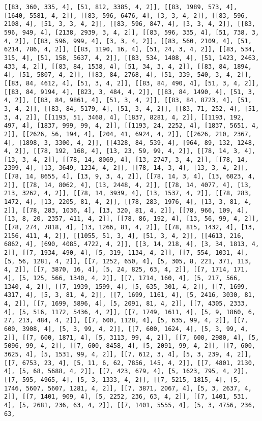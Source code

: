 \documentclass[12pt,fleqn]{article}\usepackage{../../common}
\begin{document}
\begin{verbatim}
[[83, 360, 335, 4], [51, 812, 3385, 4, 2]], [[83, 1989, 573, 4], [1640, 5581, 4, 2]], [[83, 596, 6476, 4], [3, 3, 4, 2]], [[83, 596, 2108, 4], [51, 3, 3, 4, 2]], [[83, 596, 847, 4], [3, 3, 4, 2]], [[83, 596, 949, 4], [2138, 2939, 3, 4, 2]], [[83, 596, 335, 4], [51, 738, 3, 4, 2]], [[83, 596, 999, 4], [3, 3, 4, 2]], [[83, 560, 2109, 4], [51, 6214, 786, 4, 2]], [[83, 1190, 16, 4], [51, 24, 3, 4, 2]], [[83, 534, 315, 4], [51, 158, 5637, 4, 2]], [[83, 534, 1408, 4], [51, 1423, 2463, 433, 4, 2]], [[83, 84, 1538, 4], [51, 34, 3, 4, 2]], [[83, 84, 1894, 4], [51, 5807, 4, 2]], [[83, 84, 2768, 4], [51, 339, 540, 3, 4, 2]], [[83, 84, 4612, 4], [51, 3, 4, 2]], [[83, 84, 490, 4], [51, 3, 4, 2]], [[83, 84, 9194, 4], [823, 3, 484, 4, 2]], [[83, 84, 1490, 4], [51, 3, 4, 2]], [[83, 84, 9861, 4], [51, 3, 4, 2]], [[83, 84, 8723, 4], [51, 3, 4, 2]], [[83, 84, 5179, 4], [51, 3, 4, 2]], [[83, 71, 252, 4], [51, 3, 4, 2]], [[1193, 51, 3468, 4], [1837, 8281, 4, 2]], [[1193, 192, 497, 4], [1837, 999, 99, 4, 2]], [[1193, 24, 2252, 4], [1837, 5651, 4, 2]], [[2626, 56, 194, 4], [204, 41, 6924, 4, 2]], [[2626, 210, 2367, 4], [1898, 3, 3300, 4, 2]], [[4328, 84, 539, 4], [964, 89, 132, 1248, 4, 2]], [[78, 192, 168, 4], [13, 23, 59, 99, 4, 2]], [[78, 14, 3, 4], [13, 3, 4, 2]], [[78, 14, 8069, 4], [13, 2747, 3, 4, 2]], [[78, 14, 2399, 4], [13, 3649, 1234, 4, 2]], [[78, 14, 3, 4], [13, 3, 4, 2]], [[78, 14, 8655, 4], [13, 9, 3, 4, 2]], [[78, 14, 3, 4], [13, 6023, 4, 2]], [[78, 14, 8062, 4], [13, 2448, 4, 2]], [[78, 14, 4077, 4], [13, 213, 3262, 4, 2]], [[78, 14, 3939, 4], [13, 1537, 4, 2]], [[78, 283, 1472, 4], [13, 2205, 81, 4, 2]], [[78, 283, 1976, 4], [13, 3, 81, 4, 2]], [[78, 283, 1036, 4], [13, 320, 81, 4, 2]], [[78, 966, 109, 4], [13, 8, 20, 2357, 411, 4, 2]], [[78, 86, 192, 4], [13, 56, 99, 4, 2]], [[78, 274, 7818, 4], [13, 1266, 81, 4, 2]], [[78, 815, 1432, 4], [13, 2156, 411, 4, 2]], [[1055, 51, 3, 4], [51, 3, 4, 2]], [[4613, 216, 6862, 4], [690, 4085, 4722, 4, 2]], [[3, 14, 218, 4], [3, 34, 1813, 4, 2]], [[7, 1934, 490, 4], [5, 319, 1134, 4, 2]], [[7, 554, 1031, 4], [5, 56, 1281, 4, 2]], [[7, 1252, 650, 4], [5, 305, 8, 221, 371, 113, 4, 2]], [[7, 3870, 16, 4], [5, 24, 825, 63, 4, 2]], [[7, 1714, 171, 4], [5, 125, 566, 1340, 4, 2]], [[7, 1714, 160, 4], [5, 217, 566, 1340, 4, 2]], [[7, 1939, 1599, 4], [5, 635, 301, 4, 2]], [[7, 1699, 4317, 4], [5, 3, 81, 4, 2]], [[7, 1699, 1161, 4], [5, 2416, 3030, 81, 4, 2]], [[7, 1699, 5896, 4], [5, 2091, 81, 4, 2]], [[7, 4305, 2333, 4], [5, 516, 1172, 5436, 4, 2]], [[7, 1749, 1611, 4], [5, 9, 1860, 6, 27, 213, 484, 4, 2]], [[7, 600, 1128, 4], [5, 635, 99, 4, 2]], [[7, 600, 3908, 4], [5, 3, 99, 4, 2]], [[7, 600, 1624, 4], [5, 3, 99, 4, 2]], [[7, 600, 1871, 4], [5, 3113, 99, 4, 2]], [[7, 600, 2980, 4], [5, 5096, 99, 4, 2]], [[7, 600, 8458, 4], [5, 2091, 99, 4, 2]], [[7, 600, 3625, 4], [5, 1531, 99, 4, 2]], [[7, 612, 3, 4], [5, 3, 239, 4, 2]], [[7, 6753, 23, 4], [5, 11, 6, 62, 7856, 145, 4, 2]], [[7, 4801, 2130, 4], [5, 68, 5688, 4, 2]], [[7, 423, 679, 4], [5, 1623, 795, 4, 2]], [[7, 595, 4965, 4], [5, 3, 1333, 4, 2]], [[7, 5215, 1815, 4], [5, 1746, 5607, 5607, 1281, 4, 2]], [[7, 3871, 2067, 4], [5, 3, 2637, 4, 2]], [[7, 1401, 909, 4], [5, 2252, 236, 63, 4, 2]], [[7, 1401, 531, 4], [5, 2681, 236, 63, 4, 2]], [[7, 1401, 5555, 4], [5, 3, 4756, 236, 63, 
\end{verbatim}
\end{document}
